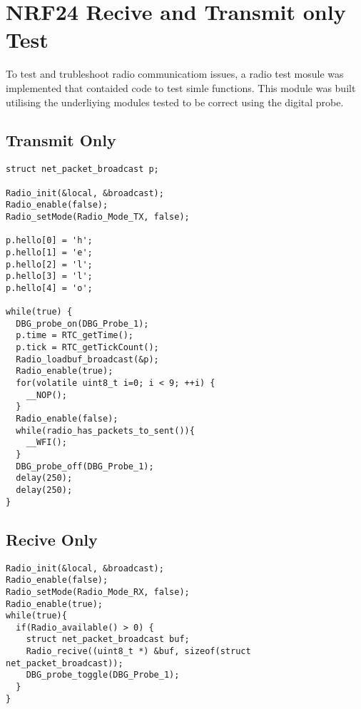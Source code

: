 \chapter{\ac{NRF24} Recive and Transmit only Test}

To test and trubleshoot radio communicatiom issues, a radio test mosule was implemented that
contaided code to test simle functions. This module was built utilising the underliying modules
tested to be correct using the digital probe.

\section{Transmit Only}
\begin{lstlisting}
struct net_packet_broadcast p;

Radio_init(&local, &broadcast);
Radio_enable(false);
Radio_setMode(Radio_Mode_TX, false);

p.hello[0] = 'h';
p.hello[1] = 'e';
p.hello[2] = 'l';
p.hello[3] = 'l';
p.hello[4] = 'o';

while(true) {
  DBG_probe_on(DBG_Probe_1);
  p.time = RTC_getTime();
  p.tick = RTC_getTickCount();
  Radio_loadbuf_broadcast(&p);
  Radio_enable(true);
  for(volatile uint8_t i=0; i < 9; ++i) {
    __NOP();
  }
  Radio_enable(false);
  while(radio_has_packets_to_sent()){
    __WFI();
  }
  DBG_probe_off(DBG_Probe_1);
  delay(250);
  delay(250); 
}
\end{lstlisting}

\section{Recive Only}

\begin{lstlisting}
Radio_init(&local, &broadcast);
Radio_enable(false);
Radio_setMode(Radio_Mode_RX, false);
Radio_enable(true);
while(true){
  if(Radio_available() > 0) {
    struct net_packet_broadcast buf;
    Radio_recive((uint8_t *) &buf, sizeof(struct net_packet_broadcast));
    DBG_probe_toggle(DBG_Probe_1);
  }
}
\end{lstlisting}


